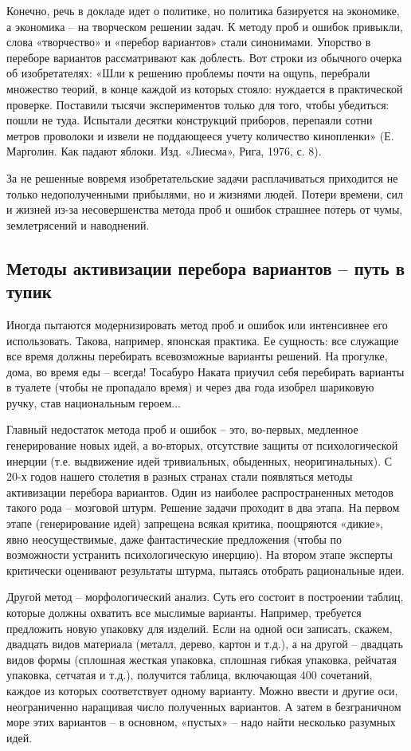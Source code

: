 \documentclass[11pt,a4paper]{article}
\begin{document}
Конечно, речь в докладе идет о политике, но политика базируется на экономике,
а экономика -- на творческом решении задач. К методу проб и ошибок привыкли,
слова «творчество» и «перебор вариантов» стали синонимами. Упорство в переборе
вариантов рассматривают как доблесть. Вот строки из обычного очерка об
изобретателях: «Шли к решению проблемы почти на ощупь, перебрали множество
теорий, в конце каждой из которых стояло: нуждается в практической
проверке. Поставили тысячи экспериментов только для того, чтобы убедиться:
пошли не туда. Испытали десятки конструкций приборов, перепаяли сотни метров
проволоки и извели не поддающееся учету количество кинопленки»
(Е. Марголин. Как падают яблоки. Изд. «Лиесма», Рига, 1976, с. 8).

За не решенные вовремя изобретательские задачи расплачиваться приходится не
только недополученными прибылями, но и жизнями людей. Потери времени, сил и
жизней из-за несовершенства метода проб и ошибок страшнее потерь от чумы,
землетрясений и наводнений.

\subsection{Методы активизации перебора вариантов -- путь в тупик}

Иногда пытаются модернизировать метод проб и ошибок или интенсивнее его
использовать. Такова, например, японская практика. Ее сущность: все служащие
все время должны перебирать всевозможные варианты решений. На прогулке, дома,
во время еды -- всегда! Тосабуро Наката приучил себя перебирать варианты в
туалете (чтобы не пропадало время) и через два года изобрел шариковую ручку,
став национальным героем...

Главный недостаток метода проб и ошибок -- это, во-первых, медленное
генерирование новых идей, а во-вторых, отсутствие защиты от психологической
инерции (т.е. выдвижение идей тривиальных, обыденных, неоригинальных). С 20-х
годов нашего столетия в разных странах стали появляться методы активизации
перебора вариантов. Один из наиболее распространенных методов такого рода --
мозговой штурм. Решение задачи проходит в два этапа. На первом этапе
(генерирование идей) запрещена всякая критика, поощряются «дикие», явно
неосуществимые, даже фантастические предложения (чтобы по возможности
устранить психологическую инерцию). На втором этапе эксперты критически
оценивают результаты штурма, пытаясь отобрать рациональные идеи.

Другой метод -- морфологический анализ. Суть его состоит в построении таблиц,
которые должны охватить все мыслимые варианты. Например, требуется предложить
новую упаковку для изделий. Если на одной оси записать, скажем, двадцать видов
материала (металл, дерево, картон и т.д.), а на другой -- двадцать видов формы
(сплошная жесткая упаковка, сплошная гибкая упаковка, рейчатая упаковка,
сетчатая и т.д.), получится таблица, включающая 400 сочетаний, каждое из
которых соответствует одному варианту. Можно ввести и другие оси,
неограниченно наращивая число полученных вариантов. А затем в безграничном
море этих вариантов -- в основном, «пустых» -- надо найти несколько разумных
идей.
\end{document}
